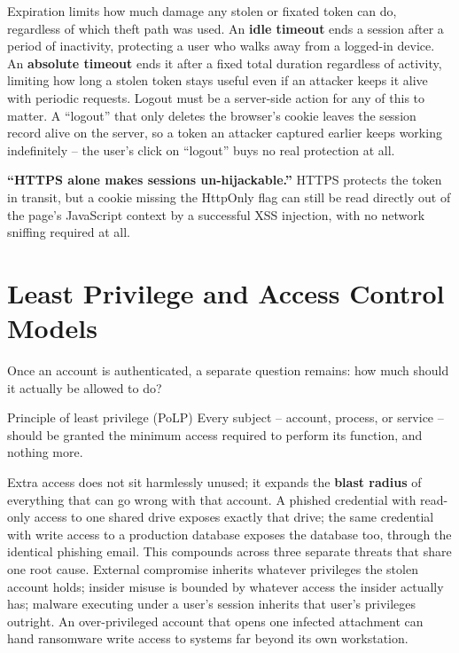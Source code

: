 Expiration limits how much damage any stolen or fixated token can do, regardless of which theft
path was used. An \textbf{idle timeout} ends a session after a period of inactivity, protecting a
user who walks away from a logged-in device. An \textbf{absolute timeout} ends it after a fixed
total duration regardless of activity, limiting how long a stolen token stays useful even if an
attacker keeps it alive with periodic requests. Logout must be a server-side action for any of this
to matter. A ``logout'' that only deletes the browser's cookie leaves the session record alive on
the server, so a token an attacker captured earlier keeps working indefinitely -- the user's click
on ``logout'' buys no real protection at all.

\begin{misconception}
\textbf{``HTTPS alone makes sessions un-hijackable.''} HTTPS protects the token in transit, but a
cookie missing the HttpOnly flag can still be read directly out of the page's JavaScript context by
a successful XSS injection, with no network sniffing required at all.
\end{misconception}

\section{Least Privilege and Access Control Models}

Once an account is authenticated, a separate question remains: how much should it actually be
allowed to do?

\begin{definition}{Principle of least privilege (PoLP)}
Every subject -- account, process, or service -- should be granted the minimum access required to
perform its function, and nothing more.
\end{definition}

Extra access does not sit harmlessly unused; it expands the \textbf{blast radius} of everything
that can go wrong with that account. A phished credential with read-only access to one shared drive
exposes exactly that drive; the same credential with write access to a production database exposes
the database too, through the identical phishing email. This compounds across three separate
threats that share one root cause. External compromise inherits whatever privileges the stolen
account holds; insider misuse is bounded by whatever access the insider actually has; malware
executing under a user's session inherits that user's privileges outright. An over-privileged
account that opens one infected attachment can hand ransomware write access to systems far beyond
its own workstation.

